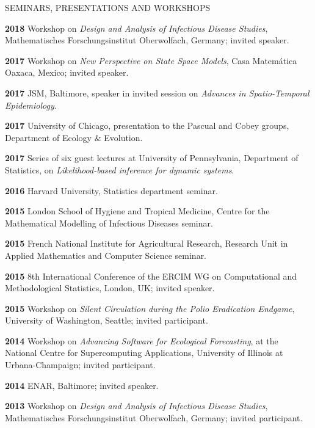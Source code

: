 \begin{mylist}{SEMINARS, PRESENTATIONS AND WORKSHOPS}
\item{\bf 2018 }  Workshop on {\it Design and Analysis of Infectious Disease Studies}, Mathematisches Forschungsinstitut Oberwolfach, Germany; invited speaker.

\item{\bf 2017 } Workshop on {\it New Perspective on State Space Models}, Casa Matem\'{a}tica Oaxaca, Mexico; invited speaker.

\item{\bf 2017 } JSM, Baltimore, speaker in invited session on {\it Advances in Spatio-Temporal Epidemiology}.

\item{\bf 2017 } University of Chicago, presentation to the Pascual and Cobey groups, Department of Ecology \& Evolution.

\item{\bf 2017 } Series of six guest lectures at University of Pennsylvania, Department of Statistics, on {\it Likelihood-based inference for dynamic systems}.

\item{\bf 2016 } Harvard University, Statistics department seminar.

\item{\bf 2015 } London School of Hygiene and Tropical Medicine, Centre for the Mathematical Modelling of Infectious Diseases seminar.

\item{\bf 2015 } French National Institute for Agricultural Research, Research Unit in Applied Mathematics and Computer Science seminar.

\item{\bf 2015 } 8th International Conference of the ERCIM WG on Computational and Methodological Statistics, London, UK; invited speaker.

\item{\bf 2015 } Workshop on {\it Silent Circulation during the Polio Eradication Endgame}, University of Washington, Seattle; invited participant. 

\item{\bf 2014 } Workshop on {\it Advancing Software for Ecological Forecasting}, at the National Centre for Supercomputing Applications, University of Illinois at Urbana-Champaign; invited participant.

\item{\bf 2014 } ENAR, Baltimore; invited speaker.

\item{\bf 2013 }  Workshop on {\it Design and Analysis of Infectious Disease Studies}, Mathematisches Forschungsinstitut Oberwolfach, Germany; invited participant.


\end{mylist}
